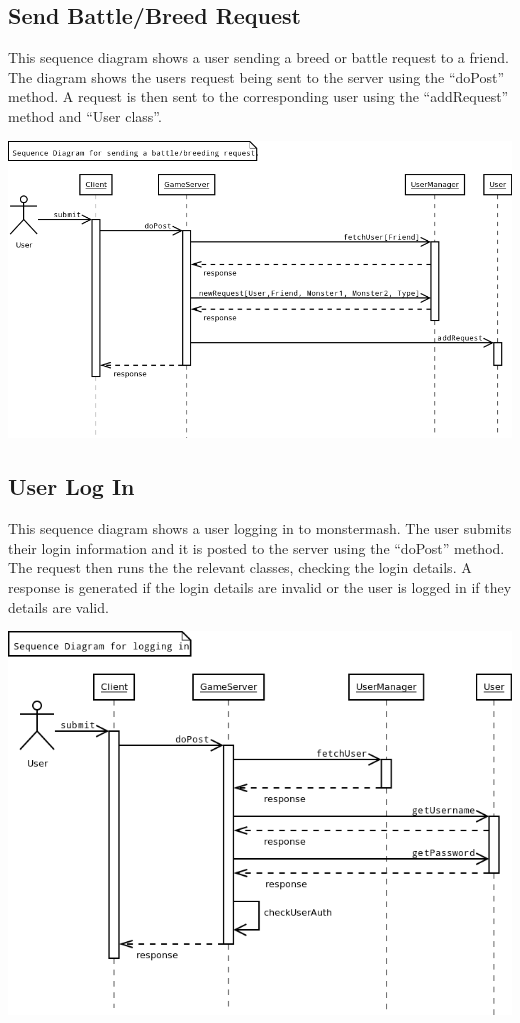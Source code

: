 \documentclass{project}
\begin{document}
\subsection{Send Battle/Breed Request}
This sequence diagram shows a user sending a breed or battle request to a friend. The diagram shows the users request being sent to the server using the “doPost” method. A request is then sent to the corresponding user using the “addRequest” method and “User class”.
\begin{center}
\includegraphics[scale=0.40]{SD_send_battle_breed_request.png}
\end{center}

\subsection{User Log In}
This sequence diagram shows a user logging in to monstermash. The user submits their login information and it is posted to the server using the “doPost” method. The request then runs the the relevant classes, checking the login details. A response is generated if the login details are invalid or the user is logged in if they details are valid.
\begin{center}
\includegraphics[scale=0.40]{SD_user_login.png}
\end{center}
\end{document}
